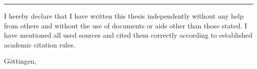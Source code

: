 \thispagestyle{empty}

\null
\vspace{16.5cm}

\rule{\textwidth}{0.4pt}

I hereby declare that I have written this thesis independently without any help from others and without the use of documents or aids other than those stated. I have mentioned all used sources and cited them correctly according to established academic citation rules.

\vspace{0.2cm}

Göttingen, \mysubmissiondate
